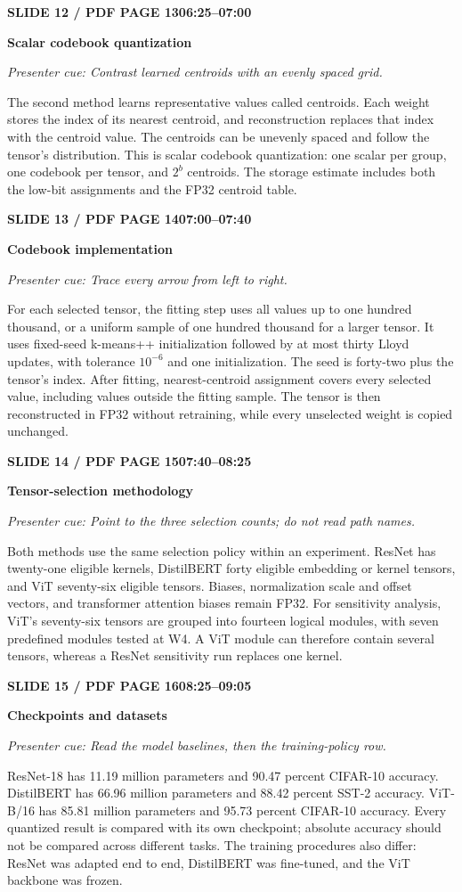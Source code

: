 \documentclass[11pt,a4paper]{article}
\newcommand{\slidetitle}[3]{%
  \vspace{2mm}\noindent
  \colorbox{TUblue}{\parbox{\dimexpr\textwidth-2\fboxsep}{\color{white}\bfseries #1\hfill #2}}%
  \par\textcolor{TUorange}{\bfseries #3}\par
}
\newcommand{\cue}[1]{\textit{\textcolor{TUblue}{Presenter cue: #1}}\par}
\newcommand{\spoken}[1]{#1\par}
\begin{document}
\slidetitle{SLIDE 12 / PDF PAGE 13}{06:25--07:00}{Scalar codebook quantization}
\cue{Contrast learned centroids with an evenly spaced grid.}
\spoken{The second method learns representative values called centroids. Each weight stores the index of its nearest centroid, and reconstruction replaces that index with the centroid value. The centroids can be unevenly spaced and follow the tensor's distribution. This is scalar codebook quantization: one scalar per group, one codebook per tensor, and $2^b$ centroids. The storage estimate includes both the low-bit assignments and the FP32 centroid table.}

\slidetitle{SLIDE 13 / PDF PAGE 14}{07:00--07:40}{Codebook implementation}
\cue{Trace every arrow from left to right.}
\spoken{For each selected tensor, the fitting step uses all values up to one hundred thousand, or a uniform sample of one hundred thousand for a larger tensor. It uses fixed-seed k-means++ initialization followed by at most thirty Lloyd updates, with tolerance $10^{-6}$ and one initialization. The seed is forty-two plus the tensor's index. After fitting, nearest-centroid assignment covers every selected value, including values outside the fitting sample. The tensor is then reconstructed in FP32 without retraining, while every unselected weight is copied unchanged.}

\slidetitle{SLIDE 14 / PDF PAGE 15}{07:40--08:25}{Tensor-selection methodology}
\cue{Point to the three selection counts; do not read path names.}
\spoken{Both methods use the same selection policy within an experiment. ResNet has twenty-one eligible kernels, DistilBERT forty eligible embedding or kernel tensors, and ViT seventy-six eligible tensors. Biases, normalization scale and offset vectors, and transformer attention biases remain FP32. For sensitivity analysis, ViT's seventy-six tensors are grouped into fourteen logical modules, with seven predefined modules tested at W4. A ViT module can therefore contain several tensors, whereas a ResNet sensitivity run replaces one kernel.}

\slidetitle{SLIDE 15 / PDF PAGE 16}{08:25--09:05}{Checkpoints and datasets}
\cue{Read the model baselines, then the training-policy row.}
\spoken{ResNet-18 has 11.19 million parameters and 90.47 percent CIFAR-10 accuracy. DistilBERT has 66.96 million parameters and 88.42 percent SST-2 accuracy. ViT-B/16 has 85.81 million parameters and 95.73 percent CIFAR-10 accuracy. Every quantized result is compared with its own checkpoint; absolute accuracy should not be compared across different tasks. The training procedures also differ: ResNet was adapted end to end, DistilBERT was fine-tuned, and the ViT backbone was frozen.}
\end{document}
